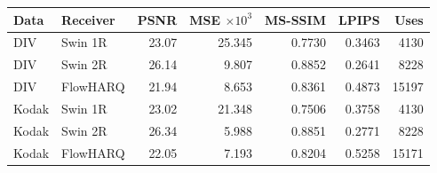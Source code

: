 \begin{tabular}{llrrrrr}
\toprule
Data & Receiver & PSNR & MSE $\times10^3$ & MS-SSIM & LPIPS & Uses \\
\midrule
DIV & Swin 1R & 23.07 & 25.345 & 0.7730 & 0.3463 & 4130 \\
DIV & Swin 2R & 26.14 & 9.807 & 0.8852 & 0.2641 & 8228 \\
DIV & FlowHARQ & 21.94 & 8.653 & 0.8361 & 0.4873 & 15197 \\
Kodak & Swin 1R & 23.02 & 21.348 & 0.7506 & 0.3758 & 4130 \\
Kodak & Swin 2R & 26.34 & 5.988 & 0.8851 & 0.2771 & 8228 \\
Kodak & FlowHARQ & 22.05 & 7.193 & 0.8204 & 0.5258 & 15171 \\
\bottomrule
\end{tabular}
